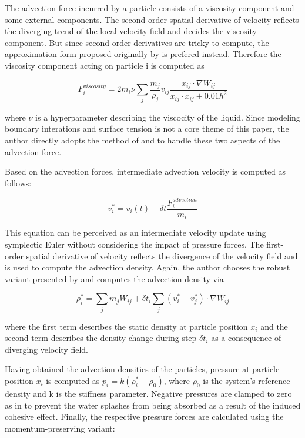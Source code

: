 \documentclass[
	11pt, 
	DIV10,
	ngerman,
	a4paper, 
	oneside, 
	headings=normal, 
	captions=tableheading,
	final, 
	numbers=noenddot
]{scrartcl}
\begin{document}
The advection force incurred by a particle consists of a viscosity component and some external components. The second-order spatial derivative of velocity reflects the diverging trend of the local velocity field and decides the viscosity component. But since second-order derivatives are tricky to compute, the approximation form proposed originally by \cite{monaghan1992smoothed} is prefered instead. Therefore the viscosity component acting on particle i is computed as

\begin{equation}
	\label{eq2}
	F_{i}^{viscosity} = 2m_{i}\nu \sum_{j}\frac{m_{j}}{\rho_{j}}v_{ij}\frac{x_{ij} \cdot \nabla W_{ij}}{x_{ij}\cdot x_{ij} + 0.01h^{2}}
\end{equation}

where $ \nu $ is a hyperparameter describing the viscocity of the liquid. Since modeling boundary interations and surface tension is not a core theme of this paper, the author directly adopts the method of \cite{akinci2012versatile} and \cite{huber2015evaluation} to handle these two aspects of the advection force.
\par
Based on the advection forces, intermediate advection velocity is computed as follows:

\begin{equation}
	\label{eq3}
	v_{i}^{*} = v_{i}(t) + \delta t\frac{F_{i}^{advection}}{m_{i}}
\end{equation}

This equation can be perceived as an intermediate velocity update using symplectic Euler without considering the impact of pressure forces. The first-order spatial derivative of velocity reflects the divergence of the velocity field and is used to compute the advection density. Again, the author chooses the robust variant presented by \cite{monaghan1992smoothed} and computes the advection density via

\begin{equation}
	\label{eq4}
	\rho_{i}^{*} = \sum_{j}m_{j}W_{ij} + \delta t_{i}\sum_{j}(v_{i}^{*} - v_{j}^{*})\cdot \nabla W_{ij}
\end{equation}

where the first term describes the static density at particle position $ x_{i} $ and the second term describes the density change during step $ \delta t_{i} $ as a consequence of diverging velocity field.
\par
Having obtained the advection densities of the particles, pressure at particle position $ x_{i} $ is computed as $ p_{i} = k(\rho_{i}^{*} - \rho_{0}) $, where $ \rho_{0} $ is the system's reference density and k is the stiffness parameter. Negative pressures are clamped to zero as in \cite{ihmsen2013implicit} to prevent the water splashes from being absorbed as a result of the induced cohesive effect. Finally, the respective pressure forces are calculated using the momentum-preserving variant:
\end{document}
